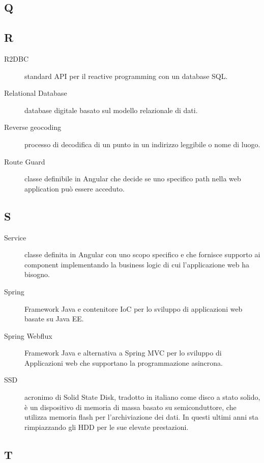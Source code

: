 \documentclass[../manuale-manutentore.tex]{subfiles}
\begin{document}
\subsection{Q}

\subsection{R}

\begin{description}
    \item[R2DBC] standard API per il reactive programming con un database SQL\@.
    \item[Relational Database] database digitale basato sul modello relazionale di dati.
    \item[Reverse geocoding] processo di decodifica di un punto in un indirizzo leggibile o nome di luogo.
    \item[Route Guard] classe definibile in Angular che decide se uno specifico path nella web application può essere acceduto.
\end{description}

\subsection{S}

\begin{description}
    \item[Service] classe definita in Angular con uno scopo specifico e che fornisce supporto ai component implementando la business logic di cui l'applicazione web ha bisogno.
    \item[Spring] Framework Java e contenitore IoC per lo sviluppo di applicazioni web basate su Java EE\@.
    \item[Spring Webflux] Framework Java e alternativa a Spring MVC per lo sviluppo di Applicazioni web che supportano la programmazione asincrona.
    \item[SSD] acronimo di Solid State Disk, tradotto in italiano come disco a stato solido, è un dispositivo di memoria di massa basato su semiconduttore, che utilizza memoria flash per l'archiviazione dei dati. In questi ultimi anni sta rimpiazzando gli HDD per le sue elevate prestazioni.
\end{description}

\subsection{T}
\end{document}
